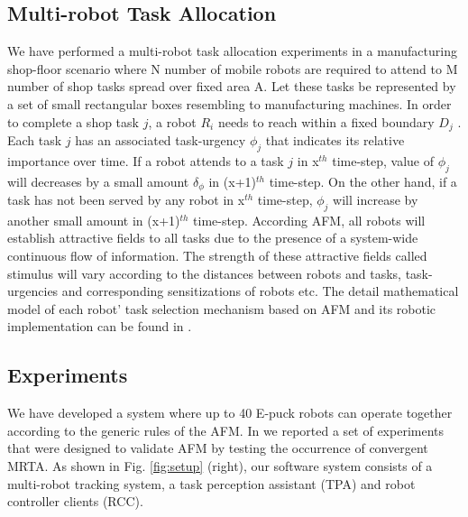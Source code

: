 \documentclass{ifacconf}
\begin{document}
\subsection{Multi-robot Task Allocation}
We have performed a multi-robot task allocation experiments in a manufacturing shop-floor scenario where N number of mobile robots are required to attend to M number of shop tasks spread over  fixed area A. Let these tasks be represented by a set of small rectangular boxes resembling to manufacturing machines. In order to complete a shop task $j$, a robot $R_i$ needs to reach within a fixed boundary $D_{j}$ . Each task $j$ has an associated task-urgency $\phi_j$ that indicates its relative importance over time. If a robot attends to a task $j$ in x$^{th}$ time-step, value of $\phi_j$ will decreases by a small amount $\delta_\phi$ in (x+1)$^{th}$ time-step. On the other hand, if a task has not been served by any robot in x$^{th}$ time-step, $\phi_j$ will increase by another small amount in (x+1)$^{th}$ time-step. According AFM, all robots will establish attractive fields to all tasks due to the presence of a system-wide continuous flow of information. The strength of these attractive fields called stimulus will vary according to the distances between robots and tasks, task-urgencies and corresponding sensitizations of robots etc. The detail mathematical model of each robot' task selection mechanism based on AFM and its robotic implementation can be found in \cite{Arcuate+2008,Sarker+2010ants}.
\subsection{Experiments}
We have developed a system where up to 40 E-puck robots \cite{Epuck} can operate together according to the generic rules of the AFM. In \cite{Sarker+2010ants}we reported a set of experiments that were designed to validate AFM by testing the occurrence of convergent MRTA.  As shown in Fig. \ref{fig:setup} (right), our software system consists of a multi-robot tracking system, a task perception assistant (TPA) and robot controller clients (RCC). 
\end{document}
